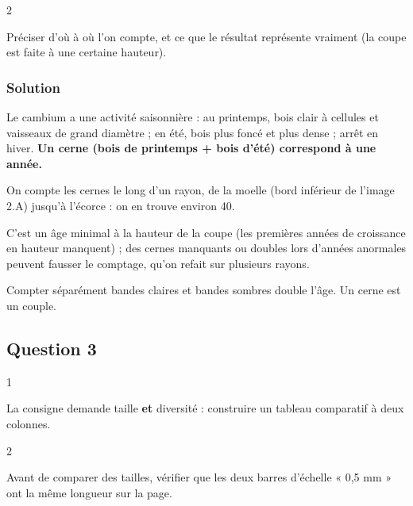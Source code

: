 \documentclass[11pt,a4paper]{article}
\newcommand{\equationajustee}[1]{%
  \sbox{\boiteequation}{$\displaystyle #1$}%
  \ifdim\wd\boiteequation>\linewidth
    \[\resizebox{\linewidth}{!}{\usebox{\boiteequation}}\]%
  \else
    \[#1\]%
  \fi}
\begin{document}
\begin{indication}{2}

Préciser d'où à où l'on compte, et ce que le résultat représente vraiment (la coupe est faite à une certaine hauteur).

\end{indication}

\hypertarget{solution-1}{%
\subsubsection{Solution}\label{solution-1}}

Le cambium a une activité saisonnière : au printemps, bois clair à cellules et vaisseaux de grand diamètre ; en été, bois plus foncé et plus dense ; arrêt en hiver. \textbf{Un cerne (bois de printemps + bois d'été) correspond à une année.}

On compte les cernes le long d'un rayon, de la moelle (bord inférieur de l'image 2.A) jusqu'à l'écorce : on en trouve environ 40.

\equationajustee{\boxed{\text{\text{âge}} \approx 40\ \text{ans (35 \text{à} 45 ans)}}}

C'est un âge minimal à la hauteur de la coupe (les premières années de croissance en hauteur manquent) ; des cernes manquants ou doubles lors d'années anormales peuvent fausser le comptage, qu'on refait sur plusieurs rayons.

\begin{piege}

Compter séparément bandes claires et bandes sombres double l'âge. Un cerne est un couple.

\end{piege}

\hypertarget{question-3}{%
\subsection{Question 3}\label{question-3}}

\begin{indication}{1}

La consigne demande taille \textbf{et} diversité : construire un tableau comparatif à deux colonnes.

\end{indication}

\begin{indication}{2}

Avant de comparer des tailles, vérifier que les deux barres d'échelle « 0,5 mm » ont la même longueur sur la page.

\end{indication}
\end{document}
